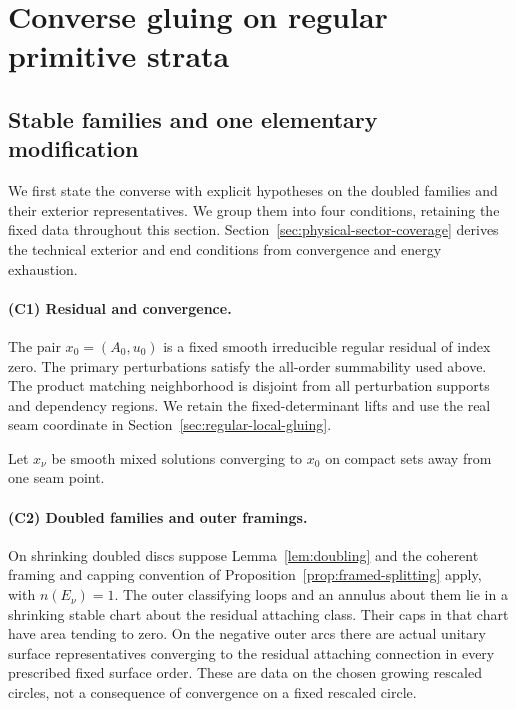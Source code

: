 \documentclass[11pt]{amsart}
\theoremstyle{definition}
\theoremstyle{remark}
\theoremstyle{plain}
\begin{document}
\section{Converse gluing on regular primitive strata}
\label{sec:regular-converse}

\subsection{Stable families and one elementary modification}

We first state the converse with explicit hypotheses on the doubled
families and their exterior representatives. We group them into four
conditions, retaining the fixed data throughout this section.
Section~\ref{sec:physical-sector-coverage} derives the technical
exterior and end conditions from convergence and energy exhaustion.

\paragraph{(C1) Residual and convergence.}
The pair $x_0=(A_0,u_0)$ is a fixed smooth irreducible regular residual
of index zero. The primary perturbations satisfy the all-order
summability used above. The product matching neighborhood is disjoint
from all perturbation supports and dependency regions. We retain the
fixed-determinant lifts and use the real seam coordinate in
Section~\ref{sec:regular-local-gluing}.

Let $x_\nu$ be smooth mixed solutions converging to $x_0$ on compact
sets away from one seam point.

\paragraph{(C2) Doubled families and outer framings.}
On shrinking doubled discs suppose
Lemma~\ref{lem:doubling} and the coherent framing and capping convention
of Proposition~\ref{prop:framed-splitting} apply, with
$n(E_\nu)=1$. The outer classifying loops and an annulus about them
lie in a shrinking stable chart about the residual attaching class.
Their caps in that chart have area tending to zero. On the negative
outer arcs there are actual unitary surface representatives converging
to the residual attaching connection in every prescribed fixed surface
order. These are data on the chosen growing rescaled circles, not a
consequence of convergence on a fixed rescaled circle.
\end{document}
